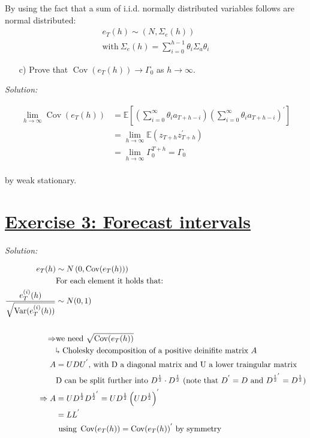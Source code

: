 \documentclass[12pt,a4paper]{article}
\newcommand{\Var}{\operatorname{Var}} %
\newcommand{\Cov}{\operatorname{Cov}}
\newcommand{\tmpsection}[1]{}
\let\tmpsection=\section
\renewcommand{\section}[1]{\tmpsection{\underline{#1}} }
\begin{document}
By using the fact that a sum of i.i.d. normally distributed variables
follows are normal distributed: \begin{align*}
  e_T (h) \sim \left( N, \Sigma_e (h)\right)\\
  \text{with} \ \Sigma_e (h) = \sum_{i = 0}^{h - 1} \theta_i \Sigma_a \theta_i
\end{align*}

\begin{itemize}
  \item[c)] Prove that $\Cov \left( e_T (h) \right) \rightarrow \Gamma_0$ as $h \rightarrow \infty$. 
\end{itemize}

\emph{Solution:}

\begin{align*}
  \lim_{h \rightarrow \infty} \Cov \left( e_T (h) \right) & = \mathbb{E} \left[ \left( \sum_{i = 0}^{\infty} \theta_i a_{T + h -i}\right)  \left( \sum_{i = 0}^{\infty} \theta_i a_{T + h -i}\right)^{'} \right] \\
  & = \lim_{h \rightarrow \infty} \mathbb{E} \left( z_{T + h} z_{T + h}^{'} \right)\\
  & = \lim_{h \rightarrow \infty} \Gamma_0^{T + h} = \Gamma_0\\
\end{align*}

by weak stationary.

\hypertarget{exercise-3-forecast-intervals}{%
\section{Exercise 3: Forecast
intervals}\label{exercise-3-forecast-intervals}}

\emph{Solution:}

\begin{align*}
  e_T (h) & \sim N \left( 0, \Cov(e_T(h))\right) \\
  & \text{For each element it holds that:}\\
  \dfrac{e_{T}^{(i)} (h) }{\sqrt{\Var(e_T^{(i)} (h))}} & \sim N(0,1)\\
  \\
  \Rightarrow & \text{we need} \ \sqrt{\Cov(e_T (h))} \\
  & \rotatebox[origin=c]{180}{$\Lsh$} \ \text{Cholesky decomposition of a positive deinifite matrix} \ A \\
  A & = UDU^{'} \text{, with D a diagonal matrix and U a lower traingular matrix}\\
  & \text{D can be split further into} \ D^{\frac{1}{2}} \cdot D^{\frac{1}{2}} \ (\text{note that} \ D^{'} = D \  \text{and} \ D^{\frac{1}{2}^{'}} = D^{\frac{1}{2}}) \\
  \Rightarrow A & = U D^{\frac{1}{2}} D^{\frac{1}{2}^{'}} = U D^{\frac{1}{2}} \left(U D^{\frac{1}{2}} \right)^{'}\\ 
  & = L L^{'}\\ 
  & \ \text{using} \ \Cov(e_T(h)) = \Cov(e_T(h))^{'} \ \text{by symmetry}
\end{align*}
\end{document}
